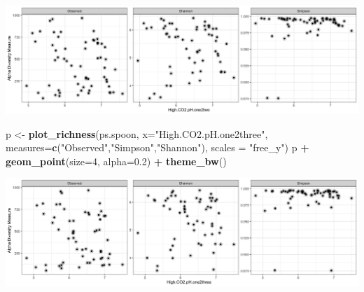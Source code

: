 \documentclass[]{article}
\newenvironment{Shaded}{\begin{snugshade}}{\end{snugshade}}
\newcommand{\DataTypeTok}[1]{\textcolor[rgb]{0.13,0.29,0.53}{#1}}
\newcommand{\DecValTok}[1]{\textcolor[rgb]{0.00,0.00,0.81}{#1}}
\newcommand{\FloatTok}[1]{\textcolor[rgb]{0.00,0.00,0.81}{#1}}
\newcommand{\KeywordTok}[1]{\textcolor[rgb]{0.13,0.29,0.53}{\textbf{#1}}}
\newcommand{\NormalTok}[1]{#1}
\newcommand{\OperatorTok}[1]{\textcolor[rgb]{0.81,0.36,0.00}{\textbf{#1}}}
\newcommand{\StringTok}[1]{\textcolor[rgb]{0.31,0.60,0.02}{#1}}
\begin{document}
\includegraphics{output-rmd/richness-ph-High.CO2.pH.one2two.spoon-1.png}

\begin{Shaded}
\begin{Highlighting}[]
\NormalTok{p <-}\StringTok{ }\KeywordTok{plot_richness}\NormalTok{(ps.spoon, }\DataTypeTok{x=}\StringTok{"High.CO2.pH.one2three"}\NormalTok{, }\DataTypeTok{measures=}\KeywordTok{c}\NormalTok{(}\StringTok{"Observed"}\NormalTok{,}\StringTok{"Simpson"}\NormalTok{,}\StringTok{"Shannon"}\NormalTok{), }\DataTypeTok{scales =} \StringTok{"free_y"}\NormalTok{)}
\NormalTok{p }\OperatorTok{+}\StringTok{ }\KeywordTok{geom_point}\NormalTok{(}\DataTypeTok{size=}\DecValTok{4}\NormalTok{, }\DataTypeTok{alpha=}\FloatTok{0.2}\NormalTok{) }\OperatorTok{+}\StringTok{ }\KeywordTok{theme_bw}\NormalTok{()}
\end{Highlighting}
\end{Shaded}

\includegraphics{output-rmd/richness-ph-High.CO2.pH.one2three.spoon-1.png}

\begin{Shaded}
\end{Shaded}
\end{document}
